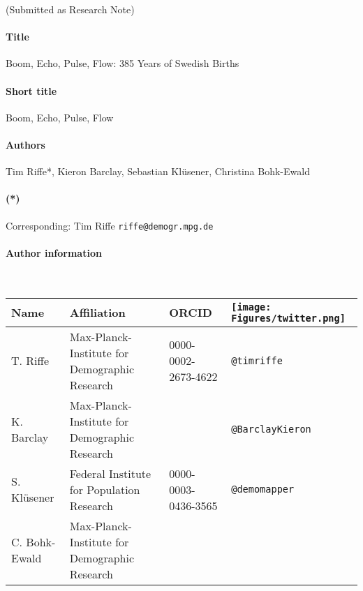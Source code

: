 \documentclass{article}
\begin{document}
(Submitted as Research Note)
 \paragraph{Title} Boom, Echo, Pulse, Flow: 385 Years of Swedish Births
 \paragraph{Short title} Boom, Echo, Pulse, Flow
 \paragraph{Authors} Tim Riffe*, Kieron Barclay, Sebastian Kl\"usener, Christina Bohk-Ewald
 \paragraph{(*)} Corresponding: Tim Riffe \texttt{riffe@demogr.mpg.de}
 
 \paragraph{Author information} ~
 \begin{table}[ht]
 \begin{center}
 \begin{tabular}{llll}
 Name & Affiliation & ORCID & \texttt{[image: Figures/twitter.png]}  \\ \hline
 T. Riffe & Max-Planck-Institute for Demographic Research & 0000-0002-2673-4622 & \texttt{@timriffe}  \\
 K. Barclay & Max-Planck-Institute for Demographic Research &  & \texttt{@BarclayKieron}  \\
 S. Kl\"usener &Federal Institute for Population Research& 0000-0003-0436-3565 & \texttt{@demomapper}  \\
 C. Bohk-Ewald & Max-Planck-Institute for Demographic Research &  &
 \end{tabular}
 \end{center}
 \end{table}
\end{document}
